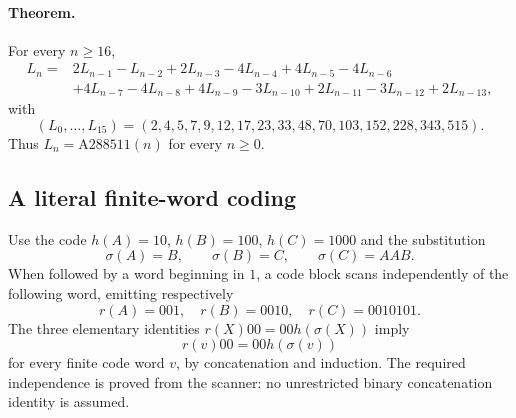 \documentclass[11pt]{article}
\begin{document}
\paragraph{Theorem.}
For every $n\ge16$,
\begin{align*}
L_n={}&2L_{n-1}-L_{n-2}+2L_{n-3}-4L_{n-4}+4L_{n-5}-4L_{n-6}\\
 &+4L_{n-7}-4L_{n-8}+4L_{n-9}-3L_{n-10}+2L_{n-11}-3L_{n-12}+2L_{n-13},
\end{align*}
with
\[
(L_0,\ldots,L_{15})=(2,4,5,7,9,12,17,23,33,48,70,103,152,228,343,515).
\]
Thus $L_n=\mathrm{A288511}(n)$ for every $n\ge0$.

\subsection{A literal finite-word coding}
Use the code $h(A)=10$, $h(B)=100$, $h(C)=1000$ and the substitution
\[
\sigma(A)=B,\qquad\sigma(B)=C,\qquad\sigma(C)=AAB.
\]
When followed by a word beginning in $1$, a code block scans independently
of the following word, emitting respectively
\[
r(A)=001,\quad r(B)=0010,\quad r(C)=0010101.
\]
The three elementary identities $r(X)00=00h(\sigma(X))$ imply
\begin{equation}
r(v)00=00h(\sigma(v))
\label{eq:a288511:rotation}
\end{equation}
for every finite code word $v$, by concatenation and induction.
The required independence is proved from the scanner: no unrestricted
binary concatenation identity is assumed.
\end{document}
